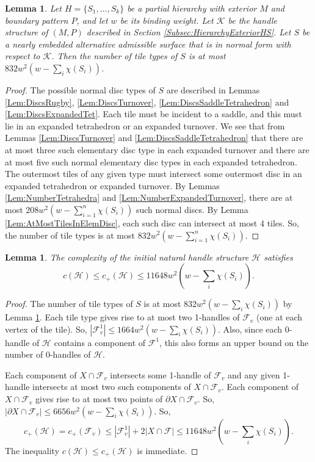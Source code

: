 \documentclass[oneside]{amsart}
\numberwithin{equation}{section}
\theoremstyle{plain}
\newtheorem{lemma}[equation]{Lemma}
\theoremstyle{definition}
\newcommand{\calH}{\mathcal{H}}
\newcommand{\calF}{\mathcal{F}}
\begin{document}
\begin{lemma}
\label{Lem:NumberStarTypesInitially}
Let $H = \{ S_1, \dots, S_k \}$ be a partial hierarchy with exterior $M$ and
boundary pattern $P$, and let $w$ be its binding weight. Let $\mathcal{K}$ be the
handle structure of $(M,P)$ described in Section \ref{Subsec:HierarchyExteriorHS}.
Let $S$ be a nearly embedded alternative admissible surface that is in normal form with respect to $\mathcal{K}$.
Then the number of tile types of $S$ is at most
$832w^2 (w - \sum_i \chi(S_i))$.
\end{lemma}

\begin{proof}
The possible normal disc types of $S$ are described in Lemmas \ref{Lem:DiscsRugby}, \ref{Lem:DiscsTurnover}, \ref{Lem:DiscsSaddleTetrahedron} and
\ref{Lem:DiscsExpandedTet}. Each tile must be incident to a saddle, and this must lie
in an expanded tetrahedron or an expanded turnover. We see that from Lemmas \ref{Lem:DiscsTurnover}
and  \ref{Lem:DiscsSaddleTetrahedron} that there are at most three such elementary disc type in each expanded
turnover and there are at most five such
normal elementary disc types in each expanded tetrahedron. The outermost tiles of any given type must intersect
some outermost disc in an expanded tetrahedron or expanded turnover. By Lemmas \ref{Lem:NumberTetrahedra} 
and \ref{Lem:NumberExpandedTurnover}, there
are at most $208w^2 (w - \sum_{i=1}^n \chi(S_i))$ such normal discs. By Lemma \ref{Lem:AtMostTilesInElemDisc},
each such disc can intersect at most 4 tiles. So, the number of tile types is at most
$832w^2 (w - \sum_{i=1}^n \chi(S_i))$.
\end{proof}

\begin{lemma}
\label{Lem:ComplexityNaturalHS}
The complexity of the initial natural handle structure $\mathcal{H}$ satisfies 
$$c(\mathcal{H}) \leq c_+(\mathcal{H}) \leq 11648w^2 (w - \sum_i \chi(S_i)).$$
\end{lemma}

\begin{proof}
The number of tile types of $S$ is at most $832w^2 (w - \sum_i \chi(S_i))$ by Lemma \ref{Lem:NumberStarTypesInitially}.
Each tile type gives rise to at most two 1-handles of $\calF_v$ (one at each vertex of the tile).
So, $|\mathcal{F}_v^1| \leq 1664w^2 (w - \sum_i \chi(S_i))$. Also, since each 0-handle of $\calH$ contains a component of $\calF^1$,
this also forms an upper bound on the number of 0-handles of $\calH$.

Each component of $X \cap \mathcal{F}_v$ intersects some 1-handle of $\calF_v$
and any given 1-handle intersects at most two such components of $X \cap \mathcal{F}_v$. 
Each component of $X \cap \mathcal{F}_v$ gives rise to at most two points of $\partial X \cap \mathcal{F}_v$.
So, $|\partial X \cap \calF_v| \leq 6656w^2 (w - \sum_i \chi(S_i))$.
So, 
$$c_+(\mathcal{H}) = c_+(\mathcal{F}_v) \leq |\mathcal{F}_v^1| + 2|X \cap \calF| \leq 11648 w^2 (w - \sum_i \chi(S_i)).$$
The inequality $c(\mathcal{H}) \leq c_+(\mathcal{H})$ is immediate.
\end{proof}
 
\end{document}
